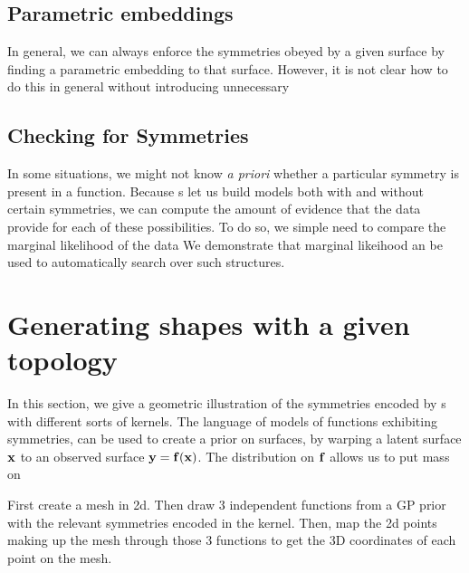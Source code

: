
\subsection{Parametric embeddings}

In general, we can always enforce the symmetries obeyed by a given surface by finding a parametric embedding to that surface.  However, it is not clear how to do this in general without introducing unnecessary 





\subsection{Checking for Symmetries}
In some situations, we might not know \emph{a priori} whether a particular symmetry is present in a function.
Because \gp{}s let us build models both with and without certain symmetries, we can compute the amount of evidence that the data provide for each of these possibilities.
To do so, we simple need to compare the marginal likelihood of the data
We demonstrate that marginal likeihood an be used to automatically search over such structures.








\section{Generating shapes with a given topology}

In this section, we give a geometric illustration of the symmetries encoded by \gp{}s with different sorts of kernels.
The language of models of functions exhibiting symmetries, can be used to create a prior on surfaces, by warping a latent surface ${\bf{x}}$ to an observed surface ${\bf{y}} = {\bf{f}}({\bf{x}})$.
The distribution on ${\bf{f}}$ allows us to put mass on 

First create a mesh in 2d.  Then draw 3 independent functions from a GP prior with the relevant symmetries encoded in the kernel.  Then, map the 2d points making up the mesh through those 3 functions to get the 3D  coordinates of each point on the mesh.

